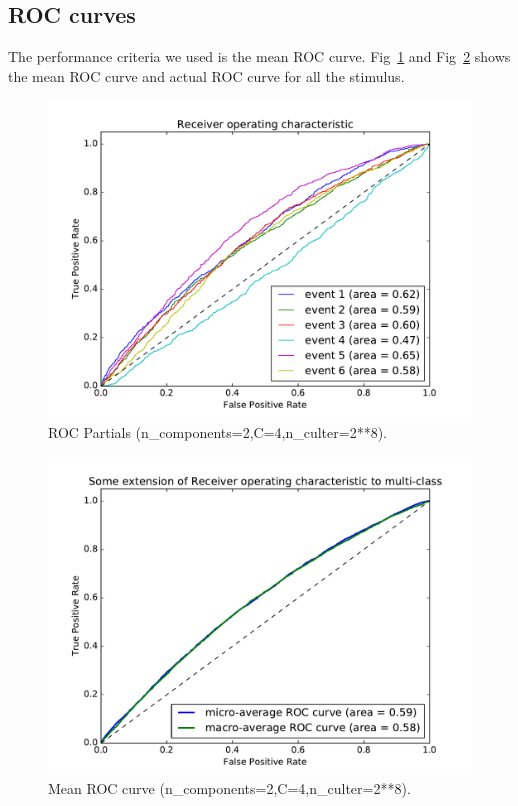 \documentclass[final,leqno,onefignum,onetabnum]{siamltexmm}
\begin{document}
\subsection{ROC curves}
The performance criteria we used is the mean ROC curve.  
Fig~\ref{fig:roc_hpc} and Fig~\ref{fig:roc_mean} shows the mean ROC curve and actual ROC curve for all the stimulus.
\begin{figure}
  \centering
  \includegraphics[width=0.60\linewidth]{images/ROC6Partials}
  \caption{ROC Partials (n\_components=2,C=4,n\_culter=2**8).\label{fig:roc_hpc}}
\end{figure}
\begin{figure}
  \centering
  \includegraphics[width=0.60\linewidth]{images/ROCMean}
  \caption{Mean ROC curve (n\_components=2,C=4,n\_culter=2**8).\label{fig:roc_mean}}
\end{figure}
\end{document}
